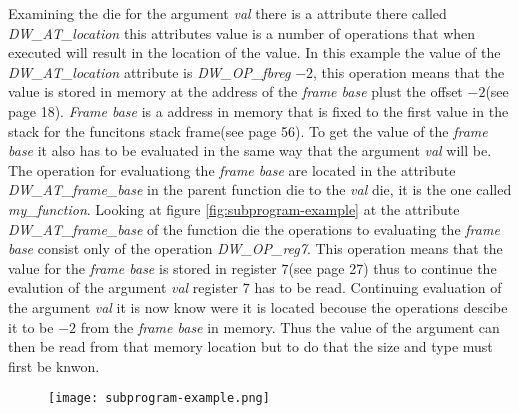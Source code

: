 Examining the \gls{die} for the argument \emph{val} there is a attribute there called \emph{DW\_AT\_location} this attributes value is a number of operations that when executed will result in the location of the value.
In this example the value of the \emph{DW\_AT\_location} attribute is \emph{DW\_OP\_fbreg} $-2$, this operation means that the value is stored in memory at the address of the \emph{frame base} plust the offset $-2$(see \cite{dwarf} page 18).
\emph{Frame base} is a address in memory that is fixed to the first value in the stack for the funcitons stack frame(see \cite{dwarf} page 56).
To get the value of the \emph{frame base} it also has to be evaluated in the same way that the argument \emph{val} will be.
The operation for evaluationg the \emph{frame base} are located in the attribute \emph{DW\_AT\_frame\_base} in the parent function \gls{die} to the \emph{val} die, it is the one called \emph{my\_function}.
Looking at figure \ref{fig:subprogram-example} at the attribute \emph{DW\_AT\_frame\_base} of the function \gls{die} the operations to evaluating the \emph{frame base} consist only of the operation \emph{DW\_OP\_reg7}.
This operation means that the value for the \emph{frame base} is stored in register $7$(see \cite{dwarf} page 27) thus to continue the evalution of the argument \emph{val} register $7$ has to be read.
Continuing evaluation of the argument \emph{val} it is now know were it is located becouse the operations descibe it to be $-2$ from the \emph{frame base} in memory.
Thus the value of the argument can then be read from that memory location but to do that the size and type must first be knwon.


\begin{figure}[h]
    \centering
    \texttt{[image: subprogram-example.png]}
    \label{fig:subprogramexample}
\end{figure}


